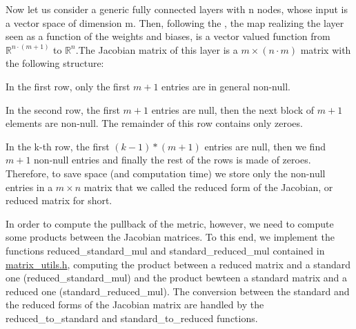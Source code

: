 Now let us consider a generic fully connected layers with n nodes, whose input is a vector space of dimension m. Then, following the , the map realizing the layer seen as a function of the weights and biases, is a vector valued function from $ \mathbb{R}^{n \cdot (m+1)} $ to $ \mathbb{R}^{n} $.The Jacobian matrix of this layer is a $ m \times (n \cdot m)$ matrix with the following structure\+:
\begin{DoxyItemize}
\item In the first row, only the first $ m+1 $ entries are in general non-\/null.
\item In the second row, the first $ m+1 $ entries are null, then the next block of $ m+1 $ elements are non-\/null. The remainder of this row contains only zeroes.
\item In the k-\/th row, the first $ (k-1)*(m+1) $ entries are null, then we find $ m+1 $ non-\/null entries and finally the rest of the rows is made of zeroes. Therefore, to save space (and computation time) we store only the non-\/null entries in a $ m \times n$ matrix that we called the reduced form of the Jacobian, or reduced matrix for short.
\end{DoxyItemize}

In order to compute the pullback of the metric, however, we need to compute some products between the Jacobian matrices. To this end, we implement the functions reduced\+\_\+standard\+\_\+mul and standard\+\_\+reduced\+\_\+mul contained in \mbox{\hyperlink{matrix__utils_8h_source}{matrix\+\_\+utils.\+h}}, computing the product between a reduced matrix and a standard one (reduced\+\_\+standard\+\_\+mul) and the product bewteen a standard matrix and a reduced one (standard\+\_\+reduced\+\_\+mul). The conversion between the standard and the reduced forms of the Jacobian matrix are handled by the reduced\+\_\+to\+\_\+standard and standard\+\_\+to\+\_\+reduced functions. 